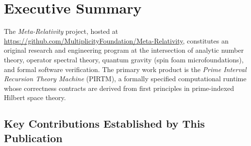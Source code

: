 \documentclass[12pt,letterpaper]{article}
\theoremstyle{definition}
\theoremstyle{remark}
\begin{document}
\tableofcontents
\newpage

\section{Executive Summary}
\label{sec:exec}

The \emph{Meta-Relativity} project, hosted at
\url{https://github.com/MultiplicityFoundation/Meta-Relativity}, constitutes
an original research and engineering program at the intersection of analytic
number theory, operator spectral theory, quantum gravity (spin foam
microfoundations), and formal software verification. The primary work product
is the \emph{Prime Interval Recursion Theory Machine} (PIRTM), a formally
specified computational runtime whose correctness contracts are derived from
first principles in prime-indexed Hilbert space theory.

\subsection*{Key Contributions Established by This Publication}
\end{document}
